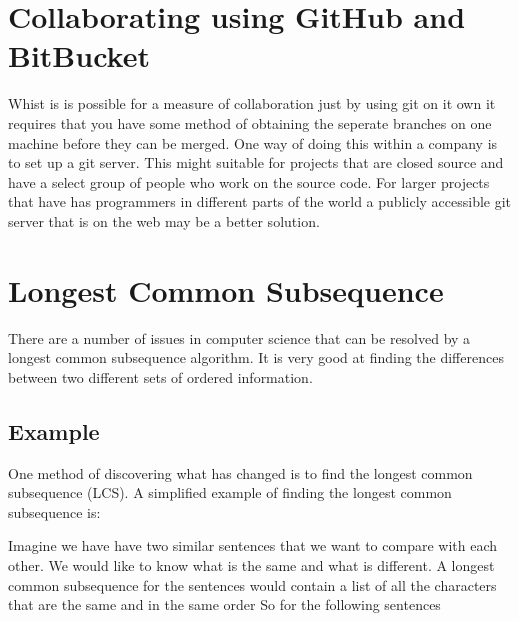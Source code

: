 
\section{Collaborating using GitHub and BitBucket}
Whist is is possible for a measure of collaboration just by using git on it own it requires that you have some method of obtaining the seperate branches on one machine before they can be merged.  One way of doing this within a company is to set up a git server.  This might suitable for projects that are closed source and have a select group of people who work on the source code.  For larger projects that have has programmers in different parts of the world a publicly accessible git server that is on the web may be a better solution.  


\section{Longest Common Subsequence}
There are a number of issues in computer science that can be resolved by a longest common subsequence algorithm.
It is very good at finding the differences between two different sets of ordered information.


\subsection{Example}
One method of discovering what has changed is to find the longest common subsequence (LCS).
A simplified example of finding the longest common subsequence is:

Imagine we have have two similar sentences that we want to compare with each other.  
We would like to know what is the same and what is different.
A longest common subsequence for the sentences would contain a list of all the characters that are the same and in the same order
So for the following sentences

